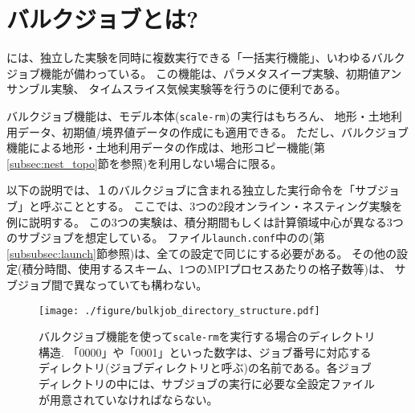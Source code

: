 
\section{バルクジョブとは?} \label{sec:bulkjob}
\scalerm には、独立した実験を同時に複数実行できる「一括実行機能」、いわゆるバルクジョブ機能が備わっている。
この機能は、パラメタスイープ実験、初期値アンサンブル実験、
タイムスライス気候実験等を行うのに便利である。

バルクジョブ機能は、モデル本体(\verb|scale-rm|)の実行はもちろん、
地形・土地利用データ、初期値/境界値データの作成にも適用できる。
ただし、バルクジョブ機能による地形・土地利用データの作成は、地形コピー機能(第\ref{subsec:nest_topo}節を参照)を利用しない場合に限る。

以下の説明では、１のバルクジョブに含まれる独立した実行命令を「サブジョブ」と呼ぶこととする。
ここでは、3つの2段オンライン・ネスティング実験を例に説明する。
この3つの実験は、積分期間もしくは計算領域中心が異なる3つのサブジョブを想定している。
ファイル\verb|launch.conf|中のの(第\ref{subsubsec:launch}節参照)は、全ての設定で同じにする必要がある。
その他の設定(積分時間、使用するスキーム、1つのMPIプロセスあたりの格子数等)は、
サブジョブ間で異なっていても構わない。

\begin{figure}[t]
\begin{center}
  \texttt{[image: ./figure/bulkjob\_directory\_structure.pdf]}\\
  \caption{バルクジョブ機能を使って\texttt{scale-rm}を実行する場合のディレクトリ構造. 「0000」や「0001」といった数字は、ジョブ番号に対応するディレクトリ(ジョブディレクトリと呼ぶ)の名前である。各ジョブディレクトリの中には、サブジョブの実行に必要な全設定ファイルが用意されていなければならない。}
  \label{fig_bulkjob}
\end{center}
\end{figure}


